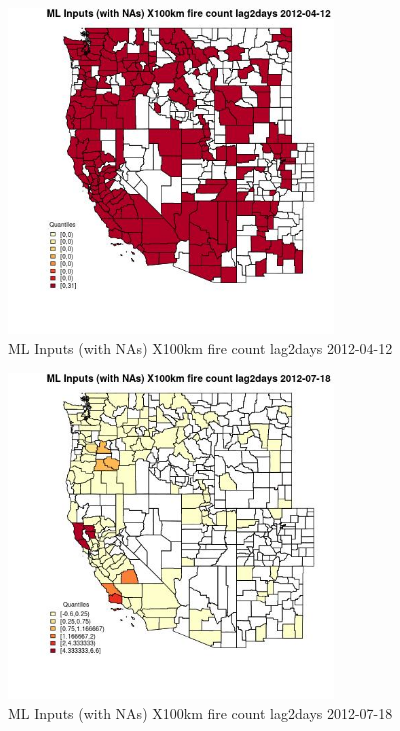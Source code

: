 \begin{figure} 
\centering  
\includegraphics[width=0.77\textwidth]{Code_Outputs/Report_ML_input_PM25_Step4_part_e_de_duplicated_aves_compiled_2019-05-14wNAs_CountyX100km_fire_count_lag2daysMean2012-04-12_2012-04-12.jpg} 
\caption{\label{fig:Report_ML_input_PM25_Step4_part_e_de_duplicated_aves_compiled_2019-05-14wNAsCountyX100km_fire_count_lag2daysMean2012-04-12_2012-04-12}ML Inputs (with NAs) X100km fire count lag2days 2012-04-12} 
\end{figure} 
 

\begin{figure} 
\centering  
\includegraphics[width=0.77\textwidth]{Code_Outputs/Report_ML_input_PM25_Step4_part_e_de_duplicated_aves_compiled_2019-05-14wNAs_CountyX100km_fire_count_lag2daysMean2012-07-18_2012-07-18.jpg} 
\caption{\label{fig:Report_ML_input_PM25_Step4_part_e_de_duplicated_aves_compiled_2019-05-14wNAsCountyX100km_fire_count_lag2daysMean2012-07-18_2012-07-18}ML Inputs (with NAs) X100km fire count lag2days 2012-07-18} 
\end{figure} 
 

